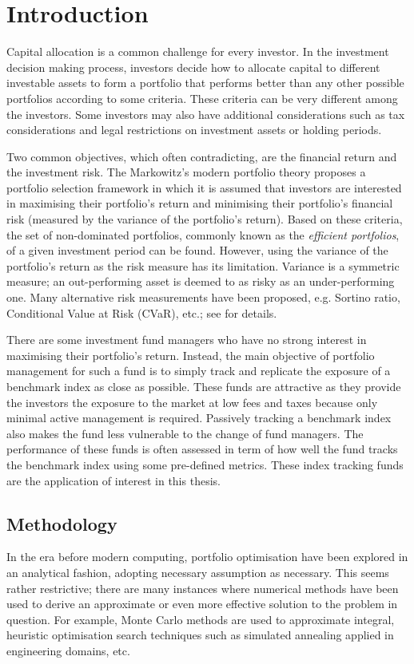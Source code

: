 \chapter{Introduction}
\graphicspath{{Chapter1/figures/}}
\label{Introduction}
Capital allocation is a common challenge for every investor. In the investment decision making process, investors decide how to allocate capital to different investable assets to form a portfolio that performs better than any other possible portfolios according to some criteria. These criteria can be very different among the investors. Some investors may also have additional considerations such as tax considerations and legal restrictions on investment assets or holding periods.

Two common objectives, which often contradicting, are the financial return and the investment risk. The Markowitz's modern portfolio theory \cite{HM52} proposes a portfolio selection framework in which it is assumed that investors are interested in maximising their portfolio's return and minimising their portfolio's financial risk (measured by the variance of the portfolio's return). Based on these criteria, the set of non-dominated portfolios, commonly known as the \emph{efficient portfolios}, of a given investment period can be found. However, using the variance of the portfolio's return as the risk measure has its limitation. Variance is a symmetric measure; an out-performing asset is deemed to as risky as an under-performing one. Many alternative risk measurements have been proposed, e.g. Sortino ratio, Conditional Value at Risk (CVaR), etc.; see \cite{RTR00} for details.

There are some investment fund managers who have no strong interest in maximising their portfolio's return. Instead, the main objective of portfolio management for such a fund is to simply track and replicate the exposure of a benchmark index as close as possible. These funds are attractive as they provide the investors the exposure to the market at low fees and taxes because only minimal active management is required. Passively tracking a benchmark index also makes the fund less vulnerable to the change of fund managers. The performance of these funds is often assessed in term of how well the fund tracks the benchmark index using some pre-defined metrics. These index tracking funds are the application of interest in this thesis.

\section{Methodology}
In the era before modern computing, portfolio optimisation have been explored in an analytical fashion, adopting necessary assumption as necessary. This seems rather restrictive; there are many instances where numerical methods have been used to derive an approximate or even more effective solution to the problem in question. For example, Monte Carlo methods are used to approximate integral, heuristic optimisation search techniques such as simulated annealing applied in engineering domains, etc.

